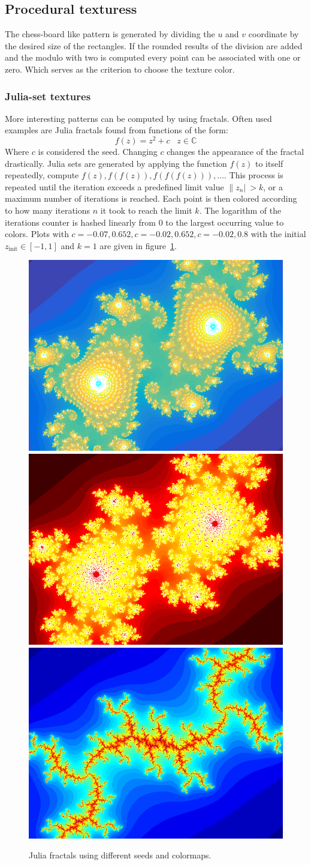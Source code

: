 \subsection{Procedural texturess}
The chess-board like pattern is generated by dividing the $u$ and $v$ coordinate by the desired size of the rectangles. If the rounded results of the division are added and the modulo with two is computed every point can be associated with one or zero. Which serves as the criterion to choose the texture color. 
\subsubsection{Julia-set textures}
More interesting patterns can be computed by using fractals. Often used examples are Julia fractals found from functions of the form:
\begin{equation}
f(z) = z^2 + c \;\;\; z \in \mathbb{C}
\end{equation}
Where $c$ is considered the seed. Changing $c$ changes the appearance of the fractal drastically. Julia sets are generated by applying the function $f(z)$ to itself repeatedly, compute $f(z),f(f(z)),f(f(f(z))),\dots$. This process is repeated until the iteration exceeds a predefined limit value $\|z_n|\ > k$, or a maximum number of iterations is reached. Each point is then colored according to how many iterations $n$ it took to reach the limit $k$. The logarithm of the iterations counter is hashed linearly from 0 to the largest occurring value to colors. Plots with $c = -0.07,0.652, c = -0.02,0.652, c= -0.02,0.8$ with the initial $z_{\text{init}} \in [-1,1]$ and $k = 1$ are given in figure~\ref{fig:julia4}.
\begin{figure}
\centering
\includegraphics[width=0.25\linewidth]{./img/julia1New}
\includegraphics[width=0.25\linewidth]{./img/julia2}
\includegraphics[width=0.25\linewidth]{./img/julia4}
\caption{Julia fractals using different seeds and colormaps.}
\label{fig:julia4}
\end{figure}

